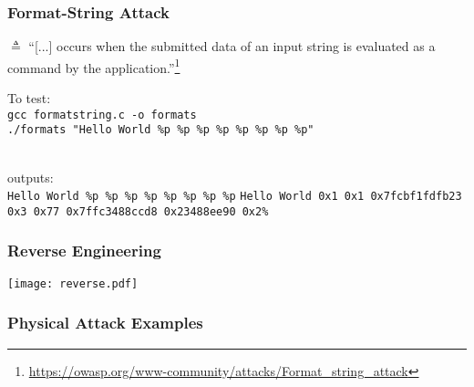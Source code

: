 \documentclass[
hyperref={pdfpagelabels=false}
,xcolor=table
]
{beamer}
\begin{document}
\begin{frame}[fragile]
  \frametitle{Format-String Attack}
  $\triangleq$ ``[...] occurs when the submitted data of an input string is evaluated as a command by the application.''\footnote{\url{https://owasp.org/www-community/attacks/Format_string_attack}}

\vfill

  
  \hspace{-0.7cm}\begin{minipage}{.3\linewidth}
    
  \end{minipage}
  \hspace{0.2cm}
  \begin{minipage}{.6\linewidth}
\small    To test: \\ 
\verb+gcc formatstring.c -o formats+ \\
\verb+./formats "Hello World %p %p %p %p %p %p %p %p"+ \\

\

outputs:\\
\verb+Hello World %p %p %p %p %p %p %p %p+
\verb+Hello World 0x1 0x1 0x7fcbf1fdfb23 0x3 0x77 0x7ffc3488ccd8 0x23488ee90 0x2%+
\end{minipage}
\end{frame}





\begin{frame}
  \frametitle{Reverse Engineering}
  \begin{center}
    \texttt{[image: reverse.pdf]}
  \end{center}
\end{frame}



\begin{frame}
  \frametitle{Physical Attack Examples}

  
\end{frame}


\end{document}
